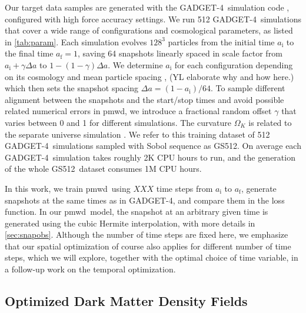 \documentclass[modern, trackchanges, dvipsnames]{aastex631}
\newcommand{\pmwd}{{\usefont{T1}{nova}{m}{sl}pmwd}}
\newcommand{\GADGET}{{{\fontsize{10pt}{12pt}\selectfont GADGET}-4}}
\newcommand{\GSDATA}{{GS512}}
\newcommand{\OmegaK}{\Omega_K}
\newcommand{\ic}{\mathrm{i}}
\newcommand{\f}{\mathrm{f}}
\newcommand{\YL}[1]{\textcolor{Bittersweet}{#1}}
\begin{document}
Our target data samples are generated with the \GADGET\ simulation code
\citep{GADGET-4}, configured with high force accuracy settings.
We run 512 \GADGET\ simulations that cover a wide range of
configurations and cosmological parameters, as listed in
\autoref{tab:param}.
\YL{
Each simulation evolves $128^3$ particles from the initial time $a_\ic$
to the final time $a_\f=1$, saving 64 snapshots linearly spaced in scale
factor from $a_\ic + \gamma \Delta a$ to $1 - (1 - \gamma) \Delta a$.
We determine $a_\ic$ for each configuration depending on its cosmology
and mean particle spacing \citep{MichauxEtAl2021}, \YL{(YL elaborate why
and how here.)} which then sets the snapshot spacing $\Delta a = (1 -
a_\ic) / 64$.
To sample different alignment between the snapshots and the start/stop
times and avoid possible related numerical errors in \pmwd, we introduce
a fractional random offset $\gamma$ that varies between 0 and 1 for
different simulations.
}
The curvature $\OmegaK$ is related to the separate universe simulation
\citep{LiEtAl2014, WagnerEtAl2015}.
We refer to this training dataset of 512 \GADGET\ simulations
sampled with Sobol sequence as \GSDATA.
On average each \GADGET\ simulation takes roughly 2K CPU hours to run,
and the generation of the whole \GSDATA\ dataset consumes 1M CPU hours.

\YL{
In this work, we train \pmwd\ using $XXX$ time steps from $a_\ic$ to
$a_\f$, generate snapshots at the same times as in \GADGET, and compare
them in the loss function.}
In our \pmwd\ model, the snapshot at an arbitrary given time is
generated using the cubic Hermite interpolation, with more details in
\autoref{sec:snapobs}.
\YL{Although the number of time steps are fixed here, we emphasize that
our spatial optimization of course also applies for different number of
time steps, which we will explore, together with the optimal choice of
time variable, in a follow-up work on the temporal optimization.
}


\subsection{Optimized Dark Matter Density Fields}
\end{document}
